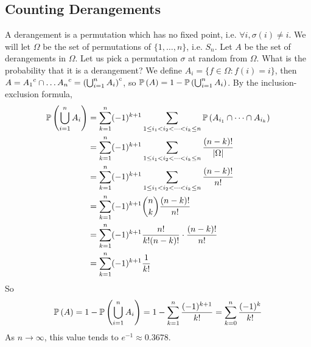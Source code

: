 \documentclass{article}
\begin{document}
\subsection{Counting Derangements}
A derangement is a permutation which has no fixed point, i.e. $\forall i, \sigma(i) \neq i$. We will let $\Omega$ be the set of permutations of $\{1, \dots, n\}$, i.e. $S_n$. Let $A$ be the set of derangements in $\Omega$. Let us pick a permutation $\sigma$ at random from $\Omega$. What is the probability that it is a derangement? We define $A_i = \{ f \in \Omega \colon f(i) = i \}$, then $A = {A_1}^c \cap \dots {A_n}^c = {\left( \bigcup_{i=1}^n A_i  \right)}^c$, so $\mathbb{P}\left({A}\right) = 1 - \mathbb{P}\left({\bigcup_{i=1}^n A_i}\right)$. By the inclusion-exclusion formula,
\begin{align*}
	\mathbb{P}\left({\bigcup_{i=1}^n A_i}\right) & = \sum_{k=1}^n (-1)^{k+1} \sum_{1 \leq i_1 < i_2 < \dots < i_k \leq n} \mathbb{P}\left({A_{i_1} \cap \dots \cap A_{i_k}}\right) \\
	                           & = \sum_{k=1}^n (-1)^{k+1} \sum_{1 \leq i_1 < i_2 < \dots < i_k \leq n} \frac{(n-k)!}{\abs{\Omega}}            \\
	                           & = \sum_{k=1}^n (-1)^{k+1} \sum_{1 \leq i_1 < i_2 < \dots < i_k \leq n} \frac{(n-k)!}{n!}                      \\
	                           & = \sum_{k=1}^n (-1)^{k+1} \binom{n}{k} \frac{(n-k)!}{n!}                                                      \\
	                           & = \sum_{k=1}^n (-1)^{k+1} \frac{n!}{k!(n-k)!} \cdot \frac{(n-k)!}{n!}                                         \\
	                           & = \sum_{k=1}^n (-1)^{k+1} \frac{1}{k!}                                                                        \\
\end{align*}
So
\[ \mathbb{P}\left({A}\right) = 1 - \mathbb{P}\left({\bigcup_{i=1}^n A_i}\right) = 1 - \sum_{k=1}^n \frac{(-1)^{k+1}}{k!} = \sum_{k=0}^n \frac{(-1)^k}{k!} \]
As $n \to \infty$, this value tends to $e^{-1} \approx 0.3678$.
\end{document}
